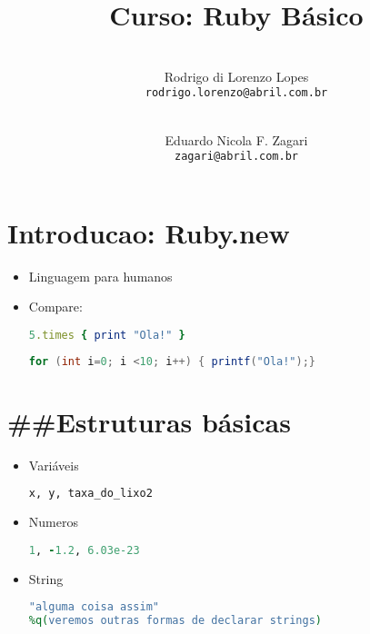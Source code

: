 \documentclass[serif,mathserif]{article}
\author{ 
    \\ Rodrigo di Lorenzo Lopes \\  \texttt{rodrigo.lorenzo@abril.com.br}
	\and 
    \\ Eduardo Nicola F. Zagari \\ \texttt{zagari@abril.com.br}
}
\title{Curso: Ruby Básico}
\begin{document}
\maketitle
 
\tableofcontents

\section{Introducao: Ruby.new}
\begin{frame} 

\begin{itemize}
\item Linguagem para humanos
\item Compare:
\begin{lstlisting}[language=ruby]
5.times { print "Ola!" }
\end{lstlisting}

\begin{lstlisting}[language=java]
for (int i=0; i <10; i++) { printf("Ola!");}
\end{lstlisting}

\end{itemize}

\end{frame}

\section{\#\#Estruturas básicas}
\begin{frame} 

\begin{itemize}
  \item Variáveis 
\begin{lstlisting}[language=ruby]
x, y, taxa_do_lixo2
\end{lstlisting} 
   \item{Numeros}
\begin{lstlisting}[language=ruby]
1, -1.2, 6.03e-23    
\end{lstlisting}
	\item {String}
\begin{lstlisting}[language=ruby]
"alguma coisa assim"
%q(veremos outras formas de declarar strings)
\end{lstlisting}
 
\end{itemize}

\end{frame}
\end{document}
